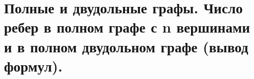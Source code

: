 \section{Полные и двудольные графы. Число ребер в полном графе с n вершинами и в полном 
двудольном графе (вывод формул).}